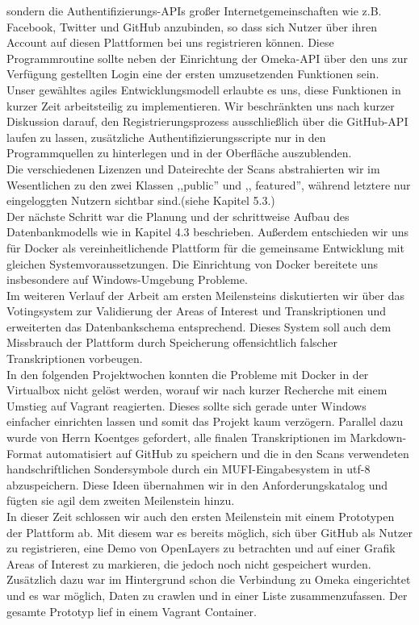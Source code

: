 \documentclass{article}
\begin{document}
sondern die Authentifizierungs-APIs großer Internetgemeinschaften wie z.B. Facebook, Twitter und GitHub anzubinden, so dass sich Nutzer über ihren Account auf diesen Plattformen bei uns registrieren können.
Diese Programmroutine sollte neben der Einrichtung der Omeka-API über den uns zur Verfügung gestellten Login eine der ersten umzusetzenden Funktionen sein.\\
Unser gewähltes agiles Entwicklungsmodell erlaubte es uns, diese Funktionen in kurzer Zeit arbeitsteilig zu implementieren.
Wir beschränkten uns nach kurzer Diskussion darauf, den Registrierungsprozess ausschließlich über die GitHub-API laufen zu lassen, zusätzliche Authentifizierungsscripte nur in den Programmquellen zu hinterlegen und in der Oberfläche auszublenden.\\
Die verschiedenen Lizenzen und Dateirechte der Scans abstrahierten wir im Wesentlichen zu den zwei Klassen ,,public'' und ,, featured'', während letztere nur eingeloggten Nutzern sichtbar sind.(siehe Kapitel 5.3.)\\
Der nächste Schritt war die Planung und der schrittweise Aufbau des Datenbankmodells wie in Kapitel 4.3 beschrieben. 
Außerdem entschieden wir uns für Docker als vereinheitlichende Plattform für die gemeinsame Entwicklung mit gleichen Systemvoraussetzungen.
Die Einrichtung von Docker bereitete uns insbesondere auf Windows-Umgebung Probleme.\\
Im weiteren Verlauf der Arbeit am ersten Meilensteins diskutierten wir über das Votingsystem zur Validierung der Areas of Interest und Transkriptionen und 
erweiterten das Datenbankschema entsprechend. 
Dieses System soll auch dem Missbrauch der Plattform durch Speicherung offensichtlich falscher Transkriptionen vorbeugen.\\
In den folgenden Projektwochen konnten die Probleme mit Docker in der Virtualbox nicht gelöst werden, worauf wir nach kurzer Recherche mit einem Umstieg auf Vagrant reagierten.
Dieses sollte sich gerade unter Windows einfacher einrichten lassen und somit das Projekt kaum verzögern.
Parallel dazu wurde von Herrn Koentges gefordert, alle finalen Transkriptionen im Markdown-Format automatisiert auf GitHub zu speichern und
die in den Scans verwendeten handschriftlichen Sondersymbole durch ein MUFI-Eingabesystem in utf-8 abzuspeichern.
Diese Ideen übernahmen wir in den Anforderungskatalog und fügten sie agil dem zweiten Meilenstein hinzu.\\
In dieser Zeit schlossen wir auch den ersten Meilenstein mit einem Prototypen der Plattform ab. 
Mit diesem war es bereits möglich, sich über GitHub als Nutzer zu registrieren, eine Demo von OpenLayers zu betrachten und 
auf einer Grafik Areas of Interest zu markieren, die jedoch noch nicht gespeichert wurden. 
Zusätzlich dazu war im Hintergrund schon die Verbindung zu Omeka eingerichtet und es war möglich, 
Daten zu crawlen und in einer Liste zusammenzufassen. Der gesamte Prototyp lief in einem Vagrant Container.\\
\end{document}
